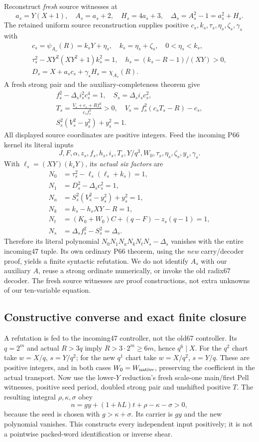 Reconstruct \emph{fresh} source witnesses at
\[
 a_s=Y(X+1),\quad A_s=a_s+2,\quad H_s=4a_s+3,
 \quad\Delta_s=A_s^2-1=a_s^2+H_s.
\]
The retained uniform source reconstruction supplies positive $c_s,k_s,
\tau_s,\eta_s,\zeta_s,\gamma_s$ with
\begin{gather*}
 c_s=\psi_{A_s}(R)=k_sY+\eta_s,
 \quad k_s=\eta_s+\zeta_s,
 \quad0<\eta_s<k_s,\\
 \tau_s^2-XY^2(XY^2+1)k_s^2=1,
 \quad h_s=(k_s-R-1)/(XY)>0,\\
 D_s=X+a_sc_s+\gamma_sH_s=\chi_{A_s}(R).
\end{gather*}
A fresh strong pair and the auxiliary-completeness theorem give
\begin{gather*}
 f_s^2-\Delta_s i_s^2c_s^4=1,
 \quad S_s=\Delta_si_sc_s^2,\\
 T_s=\frac{V_s+c_s+Rf_s^2}{c_sf_s^2}>0,
 \quad V_s=f_s^2(c_sT_s-R)-c_s,\\
 S_s^2(V_s^2-y_s^2)+y_s^2=1.
\end{gather*}
All displayed source coordinates are positive integers. Feed the incoming
P66 kernel its literal inputs
\[
 J,F,\alpha,z_s,f_s,h_s,i_s,T_s,Y/q^3,W_0,
 \tau_s,\eta_s,\zeta_s,y_s,\gamma_s.
\]
With $\ell_s=(XY)(k_sY)$, its \emph{actual six factors} are
\begin{align*}
 N_0&=\tau_s^2-\ell_s(\ell_s+k_s)=1,\\
 N_1&=D_s^2-\Delta_sc_s^2=1,\\
 N_a&=S_s^2(V_s^2-y_s^2)+y_s^2=1,\\
 N_k&=k_s-h_sXY-R=1,\\
 N_t&=(K_0+W_0)C+(q-F)-z_s(q-1)=1,\\
 N_s&=\Delta_sf_s^2-S_s^2=\Delta_s.
\end{align*}
Therefore its literal polynomial $N_0N_1N_aN_kN_tN_s-\Delta_s$ vanishes
with the entire incoming47 tuple. Its own ordinary P66 theorem, using the
\emph{new} carry/decoder proof, yields a finite syntactic refutation.
We do not identify $A_s$ with our auxiliary $A$, reuse a strong ordinate
numerically, or invoke the old radix67 decoder. The fresh source witnesses
are proof constructions, not extra unknowns of our ten-variable equation.

\subsection{Constructive converse and exact finite closure}
A refutation is fed to the incoming47 controller, not the old67 controller.
Its $q=2^m$ and actual $R>3q$ imply $R>3\cdot2^m\ge6m$, hence $q^6\mid X$.
For the $q^2$ chart take $w=X/q$, $s=Y/q^2$; for the new $q^1$ chart take
$w=X/q^2$, $s=Y/q$. These are positive integers, and in both cases
$W_0=W_{\rm native}$, preserving the coefficient in the actual transport.
Now use the lower-$Y$ reduction's fresh scale-one main/first Pell witnesses,
positive seed period, doubled strong pair and unshifted positive $T$.
The resulting integral $\rho,\kappa,\sigma$ obey
\[
 n=gy+(1+hL)t+\rho-\kappa-\sigma>0,
\]
because the seed is chosen with $g>\kappa+\sigma$. Its carrier is $gy$ and
the new polynomial vanishes. This constructs every independent input positively;
it is not a pointwise packed-word identification or inverse shear.

